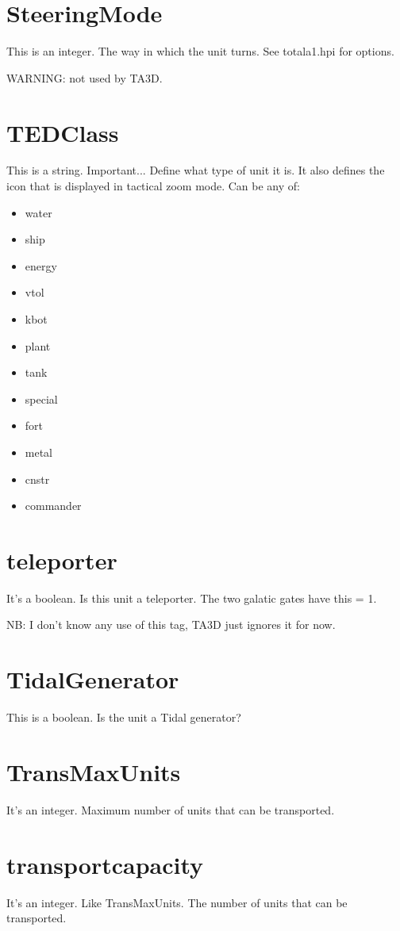 \documentclass[a4paper,10pt]{article}
\begin{document}
\section{SteeringMode}
This is an integer. The way in which the unit turns. See totala1.hpi for options.

WARNING: not used by TA3D.

\section{TEDClass}
This is a string. Important... Define what type of unit it is. It also defines the icon that is displayed in tactical zoom mode.
Can be any of:
\begin{itemize}
 \item water
 \item ship
 \item energy
 \item vtol
 \item kbot
 \item plant
 \item tank
 \item special
 \item fort
 \item metal
 \item cnstr
 \item commander
\end{itemize}

\section{teleporter}
It's a boolean. Is this unit a teleporter. The two galatic gates have this = 1.

NB: I don't know any use of this tag, TA3D just ignores it for now.

\section{TidalGenerator}
This is a boolean. Is the unit a Tidal generator?

\section{TransMaxUnits}
It's an integer. Maximum number of units that can be transported.

\section{transportcapacity}
It's an integer. Like TransMaxUnits. The number of units that can be transported.
\end{document}
